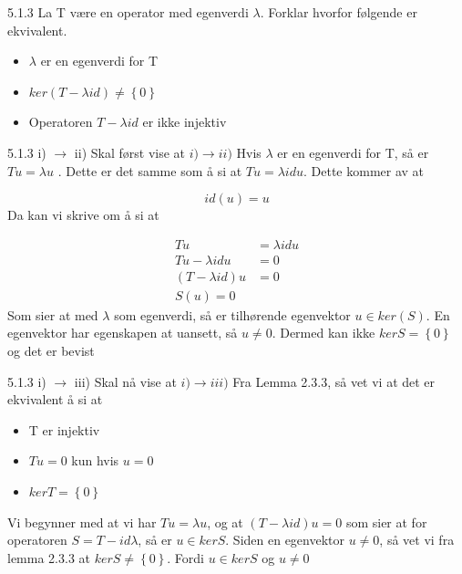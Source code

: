 \documentclass[a4paper,norsk]{article}
\begin{document}
\begin{oppgavebox}{5.1.3}{}
La T være en operator med egenverdi $ \lambda  $. Forklar hvorfor følgende er ekvivalent. 
\begin{itemize}
    \item $ \lambda  $ er en egenverdi for T 
    \item $ ker \left( T - \lambda id \right) \neq \left\{ 0 \right\}  $ 
    \item Operatoren $ T - \lambda id $ er ikke injektiv 
\end{itemize}

\begin{proofbox}{5.1.3 i) $ \rightarrow $ ii) }{}
Skal først vise at $ i) \rightarrow ii) $ Hvis $ \lambda  $ er en egenverdi for T, så er $ T u = \lambda u $ . Dette er det samme som å si at $ T u = \lambda id u $. Dette kommer av at 

\[
    id(u) = u
\]
Da kan vi skrive om å si at

\begin{align*}
    Tu &= \lambda id u \\
    Tu - \lambda id u &= 0 \\
    \left( T - \lambda id \right) u &= 0 \\
    S(u) = 0
\end{align*}
Som sier at med $ \lambda  $ som egenverdi, så er tilhørende egenvektor $ u \in ker \left( S \right) $. En egenvektor har egenskapen at uansett, så  $ u \neq 0 $. Dermed kan ikke $ ker S = \left\{ 0 \right\}  $ og det er bevist
\end{proofbox}

\begin{proofbox}{5.1.3 i) $ \rightarrow $ iii) }{}
Skal nå vise at $ i) \rightarrow iii) $ Fra Lemma 2.3.3, så vet vi at det er ekvivalent å si at 

\begin{itemize}
    \item T er injektiv
    \item $ Tu = 0 $ kun hvis $ u=0 $
    \item $ ker T = \left\{ 0 \right\}  $   
\end{itemize}

Vi begynner med at vi har $ T u = \lambda  u $, og at $ \left( T - \lambda  id \right) u = 0  $ som sier at for operatoren $ S = T -id \lambda  $, så er $ u \in kerS $. Siden en egenvektor $ u \neq 0 $, så vet vi fra lemma 2.3.3 at $ ker S \neq \left\{ 0 \right\}  $. Fordi $ u \in  ker S $ og $ u \neq 0 $  
\end{proofbox}


\end{oppgavebox}
\end{document}
